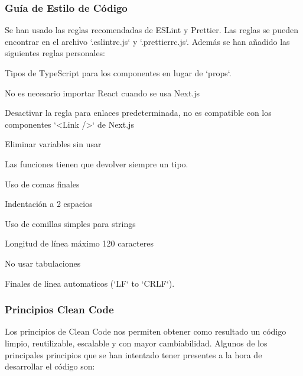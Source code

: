 \documentclass[12pt,twoside,titlepage]{report}
\begin{document}
\subsubsection{Guía de Estilo de Código}

Se han usado las reglas recomendadas de ESLint y Prettier. Las reglas se pueden encontrar en el archivo `.eslintrc.js` y `.prettierrc.js`. Además se han añadido las siguientes reglas personales:

\begin{compactitem}
    \item Tipos de TypeScript para los componentes en lugar de `props`.
    \item No es necesario importar React cuando se usa Next.js
    \item Desactivar la regla para enlaces predeterminada, no es compatible con los componentes `<Link />` de Next.js
    \item Eliminar variables sin usar
    \item Las funciones tienen que devolver siempre un tipo.
    \item Uso de comas finales
    \item Indentación a 2 espacios
    \item Uso de comillas simples para strings
    \item Longitud de línea máximo 120 caracteres
    \item No usar tabulaciones
    \item Finales de linea automaticos (`LF` to `CRLF`).
\end{compactitem}

\subsubsection{Principios Clean Code}

Los principios de Clean Code nos permiten obtener como resultado un código limpio, reutilizable, escalable y con mayor cambiabilidad. Algunos de los principales principios que se han intentado tener presentes a la hora de desarrollar el código son:
\end{document}
